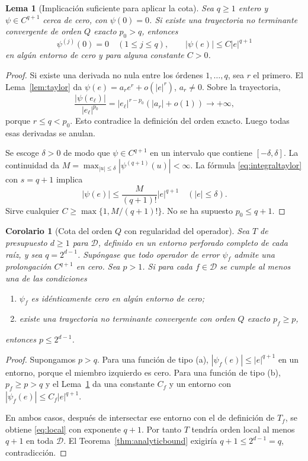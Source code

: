 \documentclass[11pt,a4paper]{article}
\numberwithin{equation}{section}
\newtheorem{lemma}[theorem]{Lema}
\newtheorem{corollary}[theorem]{Corolario}
\theoremstyle{definition}
\theoremstyle{remark}
\newcommand{\DD}{\mathcal D}
\begin{document}
\begin{lemma}[Implicación suficiente para aplicar la cota]\label{lem:Qbridge}
Sea $q\ge1$ entero y $\psi\in C^{q+1}$ cerca de cero, con $\psi(0)=0$. Si existe una trayectoria no terminante convergente de orden $Q$ exacto $p_0>q$, entonces
\[
\psi^{(j)}(0)=0\quad(1\le j\le q),\qquad
|\psi(e)|\le C|e|^{q+1}
\]
en algún entorno de cero y para alguna constante $C>0$.
\end{lemma}
\begin{proof}
Si existe una derivada no nula entre los órdenes $1,\ldots,q$, sea $r$ el primero. El Lema~\ref{lem:taylor} da $\psi(e)=a_re^r+o(|e|^r)$, $a_r\ne0$. Sobre la trayectoria,
\[
\frac{|\psi(e_\ell)|}{|e_\ell|^{p_0}}
=|e_\ell|^{r-p_0}(|a_r|+o(1))\longrightarrow+\infty,
\]
porque $r\le q<p_0$. Esto contradice la definición del orden exacto. Luego todas esas derivadas se anulan.

Se escoge $\delta>0$ de modo que $\psi\in C^{q+1}$ en un intervalo que contiene $[-\delta,\delta]$. La continuidad da $M=\max_{|u|\le\delta}|\psi^{(q+1)}(u)|<\infty$. La fórmula \eqref{eq:integraltaylor} con $s=q+1$ implica
\[
|\psi(e)|\le\frac{M}{(q+1)!}|e|^{q+1}\quad(|e|\le\delta).
\]
Sirve cualquier $C\ge\max\{1,M/(q+1)!\}$. No se ha supuesto $p_0\le q+1$.
\end{proof}

\begin{corollary}[Cota del orden $Q$ con regularidad del operador]\label{cor:Qbound}
Sea $T$ de presupuesto $d\ge1$ para $\DD$, definido en un entorno perforado completo de cada raíz, y sea $q=2^{d-1}$. Supóngase que todo operador de error $\psi_f$ admite una prolongación $C^{q+1}$ en cero. Sea $p>1$. Si para cada $f\in\DD$ se cumple al menos una de las condiciones
\begin{enumerate}[label=(\alph*)]
\item $\psi_f$ es idénticamente cero en algún entorno de cero;
\item existe una trayectoria no terminante convergente con orden $Q$ exacto $p_f\ge p$,
\end{enumerate}
entonces $p\le2^{d-1}$.
\end{corollary}
\begin{proof}
Supongamos $p>q$. Para una función de tipo (a), $|\psi_f(e)|\le|e|^{q+1}$ en un entorno, porque el miembro izquierdo es cero. Para una función de tipo (b), $p_f\ge p>q$ y el Lema~\ref{lem:Qbridge} da una constante $C_f$ y un entorno con $|\psi_f(e)|\le C_f|e|^{q+1}$.

En ambos casos, después de intersectar ese entorno con el de definición de $T_f$, se obtiene \eqref{eq:local} con exponente $q+1$. Por tanto $T$ tendría orden local al menos $q+1$ en toda $\DD$. El Teorema~\ref{thm:analyticbound} exigiría $q+1\le2^{d-1}=q$, contradicción.
\end{proof}
\end{document}
